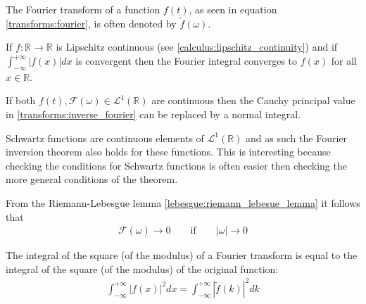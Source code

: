 	\begin{notation}
		The Fourier transform of a function $f(t)$, as seen in equation \ref{transforms:fourier}, is often denoted by $\widetilde{f}(\omega)$.
	\end{notation}
    
	\begin{theorem}
	    	If $f:\mathbb{R}\rightarrow\mathbb{R}$ is Lipschitz continuous (see \ref{calculus:lipschitz_continuity}) and if $\int_{-\infty}^{+\infty}|f(x)|dx$ is convergent then the Fourier integral converges to $f(x)$ for all $x\in\mathbb{R}$.
	\end{theorem}
	\begin{theorem}
	    	If both $f(t), \mathcal{F}(\omega)\in\mathcal{L}^1(\mathbb{R})$ are continuous then the Cauchy principal value in \ref{transforms:inverse_fourier} can be replaced by a normal integral.
	\end{theorem}
	\begin{remark}
    		Schwartz functions are continuous elements of $\mathcal{L}^1(\mathbb{R})$ and as such the Fourier inversion theorem also holds for these functions. This is interesting because checking the conditions for Schwartz functions is often easier then checking the more general conditions of the theorem.
	\end{remark}
    
	\begin{property}
	    	From the Riemann-Lebesgue lemma \ref{lebesgue:riemann_lebesue_lemma} it follows that
	        \begin{gather}
	        	\mathcal{F}(\omega)\rightarrow0 \qquad\text{if}\qquad |\omega|\rightarrow0
	        \end{gather}
	\end{property}
    
	\begin{result}
    		The integral of the square (of the modulus) of a Fourier transform is equal to the integral of the square (of the modulus) of the original function:
    		\begin{gather}
    			\label{transforms:plancherel_theorem}
        		\int_{-\infty}^{+\infty}|f(x)|^2dx = \int_{-\infty}^{+\infty}|\widetilde{f}(k)|^2dk
	   	\end{gather}
	\end{result}
	
